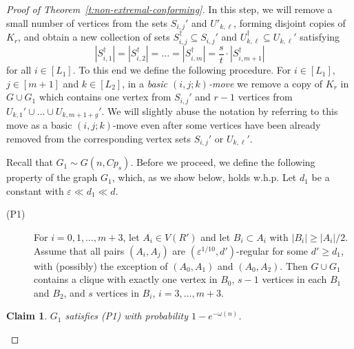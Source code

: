 \documentclass[reqno, 12pt]{amsart}
\numberwithin{equation}{section}
\numberwithin{figure}{section}
\theoremstyle{plain}
\newtheorem{claim}[thm]{Claim}
\theoremstyle{definition}
\let\eps=\varepsilon
\begin{document}
\begin{proof}[Proof of Theorem~\ref{t:non-extremal-conforming}]
    In this step, we will remove a small number of vertices from the sets $S_{i,j}'$ and $U'_{k,\ell}$, forming disjoint copies of $K_r$, and obtain a new collection of sets $S_{i,j}^\dagger\subseteq S_{i,j}'$ and $U_{k,\ell}^\dagger\subseteq U_{k,\ell}'$ satisfying
    \begin{equation}\label{eq:correct_proprtion_in_S_dagger}
        |S_{i,1}^\dagger|= |S_{i,2}^\dagger |= \dots = |S_{i,m}^\dagger| = \frac {s}{t} \cdot |S_{i,m+1}^\dagger|
    \end{equation}
    for all $i\in[L_1]$. To this end we define the following procedure. For $i\in [L_1]$, $j\in[m+1]$ and $k\in [L_2]$, in a \textit{basic $(i,j;k)$-move} we remove a copy of $K_r$ in $G \cup G_1$ which contains one vertex from $S_{i,j}'$ and $r-1$ vertices from $U_{k,1}'\cup \dots \cup U_{k,m+1+g}'$. We will slightly abuse the notation by referring to this move as a basic $(i,j;k)$-move even after some vertices have been already removed from the corresponding vertex sets $S_{i,j}'$ or $ U_{k,\ell}'$. 

    Recall that $G_1\sim G(n, Cp_s)$. Before we proceed, we define the following property of the graph $G_1$, which, as we show below, holds w.h.p. Let $d_1$ be a constant with $\eps \ll d_1 \ll d$.
    \begin{description}
	\item[(P1)] For $i=0,1,\ldots,m+3$, let $A_i\in V(R')$ and let $B_i \subset A_i$ with $|B_i| \geq |A_i|/2$. Assume that all pairs $(A_i, A_j)$ are $(\eps^{1/10}, d')$-regular for some $d' \geq d_1$, with (possibly) the exception of $(A_0, A_{1})$ and $(A_0, A_{2})$. Then $G \cup G_1$ contains a clique with exactly one vertex in $B_0$, $s-1$ vertices in each $B_{1}$ and $B_{2}$, and $s$ vertices in $B_i$, $i = 3, \dots, m+3$.
    \end{description}
			
    \begin{claim}\label{c:p1p2}
	$G_1$ satisfies (P1) with probability $1-e^{-\omega(n)}$.
    \end{claim}
            

\end{proof}
\end{document}
